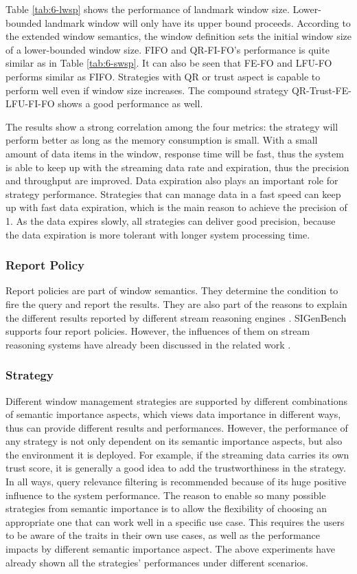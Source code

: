 Table \ref{tab:6-lwsp} shows the performance of landmark window size. 
Lower-bounded landmark window will only have its upper bound proceeds. 
According to the extended window semantics, the window definition sets the initial window size of a lower-bounded window size. 
FIFO and QR-FI-FO's performance is quite similar as in Table \ref{tab:6-swsp}. 
It can also be seen that FE-FO and LFU-FO performs similar as FIFO. 
Strategies with QR or trust aspect is capable to perform well even if window size increases. 
The compound strategy QR-Trust-FE-LFU-FI-FO shows a good performance as well. 

The results show a strong correlation among the four metrics: the strategy will perform better as long as the memory consumption is small.
With a small amount of data items in the window, response time will be fast, thus the system is able to keep up with the streaming data rate and expiration, thus the precision and throughput are improved. 
Data expiration also plays an important role for strategy performance. 
Strategies that can manage data in a fast speed can keep up with fast data expiration, which is the main reason to achieve the precision of 1. 
As the data expires slowly, all strategies can deliver good precision, because the data expiration is more tolerant with longer system processing time.
%
\subsubsection{Report Policy}
Report policies are part of window semantics. 
They determine the condition to fire the query and report the results.
They are also part of the reasons to explain the different results reported by different stream reasoning engines \cite{dell2013correctness}.
SIGenBench supports four report policies.
However, the influences of them on stream reasoning systems have already been discussed in the related work \cite{dell2013correctness}.
%
\subsubsection{Strategy}
Different window management strategies are supported by different combinations of semantic importance aspects, which views data importance in different ways, thus can provide different results and performances. 
However, the performance of any strategy is not only dependent on its semantic importance aspects, but also the environment it is deployed. 
For example, if the streaming data carries its own trust score, it is generally a good idea to add the trustworthiness in the strategy. 
In all ways, query relevance filtering is recommended because of its huge positive influence to the system performance.
The reason to enable so many possible strategies from semantic importance is to allow the flexibility of choosing an appropriate one that can work well in a specific use case. 
This requires the users to be aware of the traits in their own use cases, as well as the performance impacts by different semantic importance aspect.
The above experiments have already shown all the strategies' performances under different scenarios.
%
